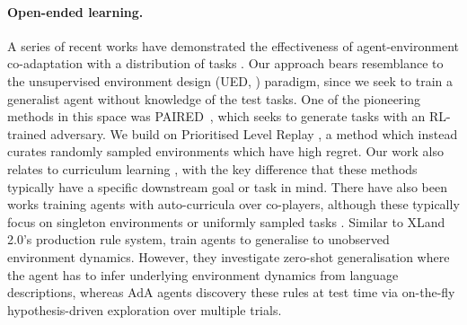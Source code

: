 \paragraph{Open-ended learning.} A series of recent works have demonstrated the effectiveness of agent-environment co-adaptation with a distribution of tasks \citep{wang2019poet, wang2020enhanced_poet, accel}. Our approach bears resemblance to the unsupervised environment design (UED, \citet{dennis2020paired}) paradigm, since we seek to train a generalist agent without knowledge of the test tasks. One of the pioneering methods in this space was PAIRED~\citep{dennis2020paired}, which seeks to generate tasks with an RL-trained adversary. We build on Prioritised Level Replay \citep{jiang2020prioritized, jiang2021robustplr}, a method which instead curates randomly sampled environments which have high regret. Our work also relates to curriculum learning \citep{matiisen2020tscl, portelas2019teacher, sukhbaatar2018asp, openai2021asymmetric, campero2020amigo, fang2021adaptive,mu2022improving}, with the key difference that these methods typically have a specific downstream goal or task in mind. There have also been works training agents with auto-curricula over co-players, although these typically focus on singleton environments \citep{alphastar, dota} or uniformly sampled tasks \citep{Baker2020Emergent, Jaderberg859, liu2018emergent, https://doi.org/10.48550/arxiv.2203.00715}. Similar to XLand 2.0's production rule system, \citet{DBLP:conf/iclr/ZhongRG20} train agents to generalise to unobserved environment dynamics. However, they investigate zero-shot generalisation where the agent has to infer underlying environment dynamics from language descriptions, whereas AdA agents discovery these rules at test time via on-the-fly hypothesis-driven exploration over multiple trials.

